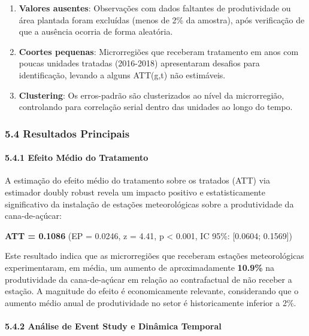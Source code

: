\documentclass[
  brazilian,
  12pt,
  a4paper,
]{article}
\begin{document}
\begin{enumerate}
\def\labelenumi{\arabic{enumi}.}
\item
  \textbf{Valores ausentes}: Observações com dados faltantes de
  produtividade ou área plantada foram excluídas (menos de 2\% da
  amostra), após verificação de que a ausência ocorria de forma
  aleatória.
\item
  \textbf{Coortes pequenas}: Microrregiões que receberam tratamento em
  anos com poucas unidades tratadas (2016-2018) apresentaram desafios
  para identificação, levando a alguns ATT(g,t) não estimáveis.
\item
  \textbf{Clustering}: Os erros-padrão são clusterizados ao nível da
  microrregião, controlando para correlação serial dentro das unidades
  ao longo do tempo.
\end{enumerate}

\subsubsection{\texorpdfstring{\textbf{5.4 Resultados
Principais}}{5.4 Resultados Principais}}\label{resultados-principais}

\paragraph{\texorpdfstring{\textbf{5.4.1 Efeito Médio do
Tratamento}}{5.4.1 Efeito Médio do Tratamento}}\label{efeito-muxe9dio-do-tratamento}

A estimação do efeito médio do tratamento sobre os tratados (ATT) via
estimador doubly robust revela um impacto positivo e estatisticamente
significativo da instalação de estações meteorológicas sobre a
produtividade da cana-de-açúcar:

\textbf{ATT = 0.1086} (EP = 0.0246, z = 4.41, p \textless{} 0.001, IC
95\%: {[}0.0604; 0.1569{]})

Este resultado indica que as microrregiões que receberam estações
meteorológicas experimentaram, em média, um aumento de aproximadamente
\textbf{10.9\%} na produtividade da cana-de-açúcar em relação ao
contrafactual de não receber a estação. A magnitude do efeito é
economicamente relevante, considerando que o aumento médio anual de
produtividade no setor é historicamente inferior a 2\%.

\paragraph{\texorpdfstring{\textbf{5.4.2 Análise de Event Study e
Dinâmica
Temporal}}{5.4.2 Análise de Event Study e Dinâmica Temporal}}\label{anuxe1lise-de-event-study-e-dinuxe2mica-temporal}
\end{document}
